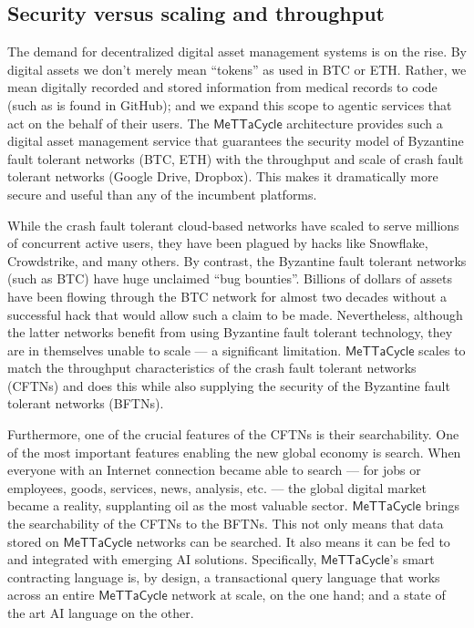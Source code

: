 \documentclass{article}
\newcommand{\MC}{\mathsf{MeTTaCycle}}
\begin{document}
\subsection{Security versus scaling and throughput}
The demand for decentralized digital asset management systems is on
the rise. By digital assets we don’t merely mean “tokens” as used in
BTC or ETH. Rather, we mean digitally recorded and stored information
from medical records to code (such as is found in GitHub); and we
expand this scope to agentic services that act on the behalf of their
users. The $\MC$ architecture provides such a digital asset
management service that guarantees the security model of Byzantine
fault tolerant networks (BTC, ETH) with the throughput and scale of
crash fault tolerant networks (Google Drive, Dropbox). This makes it
dramatically more secure and useful than any of the incumbent
platforms.

While the crash fault tolerant cloud-based networks have scaled to
serve millions of concurrent active users, they have been plagued by
hacks like Snowflake, Crowdstrike, and many others. By contrast, the
Byzantine fault tolerant networks (such as BTC) have huge unclaimed
``bug bounties''. Billions of dollars of assets have been flowing
through the BTC network for almost two decades without a successful
hack that would allow such a claim to be made. Nevertheless, although
the latter networks benefit from using Byzantine fault tolerant
technology, they are in themselves unable to scale --- a significant
limitation. $\MC$ scales to match the throughput characteristics of the
crash fault tolerant networks (CFTNs) and does this while also
supplying the security of the Byzantine fault tolerant networks
(BFTNs).

Furthermore, one of the crucial features of the CFTNs is their
searchability. One of the most important features enabling the new
global economy is search. When everyone with an Internet connection
became able to search --- for jobs or employees, goods, services, news,
analysis, etc. --- the global digital market became a reality,
supplanting oil as the most valuable sector. $\MC$ brings the
searchability of the CFTNs to the BFTNs. This not only means that data
stored on $\MC$ networks can be searched. It also means it can be
fed to and integrated with emerging AI solutions. Specifically,
$\MC$’s smart contracting language is, by design, a transactional
query language that works across an entire $\MC$ network at
scale, on the one hand; and a state of the art AI language on the other.
\end{document}
